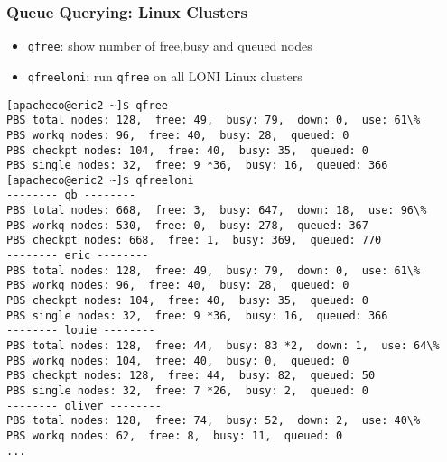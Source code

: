 \documentclass[slidestop,mathserif,compress,xcolor=svgnames,table]{beamer}
\newenvironment{bblock}[0]
{
\begin{beamerboxesrounded}[upper=uppercol1,lower=lowercol1,shadow=true]}
{\end{beamerboxesrounded}}
\newenvironment{eblock}[0]
{
\begin{beamerboxesrounded}[upper=uppercol2,lower=lowercol2,shadow=true]}
{\end{beamerboxesrounded}}
\begin{document}
\begin{frame}[fragile]
\frametitle{\small Queue Querying: Linux Clusters}
\begin{itemize}
\item \texttt{qfree}: show number of free,busy and queued nodes
\item \texttt{qfreeloni}: run \texttt{qfree} on all LONI Linux clusters
\end{itemize}
\begin{eblock}{}
{\tiny
\begin{verbatim}
[apacheco@eric2 ~]$ qfree
PBS total nodes: 128,  free: 49,  busy: 79,  down: 0,  use: 61\%
PBS workq nodes: 96,  free: 40,  busy: 28,  queued: 0
PBS checkpt nodes: 104,  free: 40,  busy: 35,  queued: 0
PBS single nodes: 32,  free: 9 *36,  busy: 16,  queued: 366
[apacheco@eric2 ~]$ qfreeloni
-------- qb --------
PBS total nodes: 668,  free: 3,  busy: 647,  down: 18,  use: 96\%
PBS workq nodes: 530,  free: 0,  busy: 278,  queued: 367
PBS checkpt nodes: 668,  free: 1,  busy: 369,  queued: 770
-------- eric --------
PBS total nodes: 128,  free: 49,  busy: 79,  down: 0,  use: 61\%
PBS workq nodes: 96,  free: 40,  busy: 28,  queued: 0
PBS checkpt nodes: 104,  free: 40,  busy: 35,  queued: 0
PBS single nodes: 32,  free: 9 *36,  busy: 16,  queued: 366
-------- louie --------
PBS total nodes: 128,  free: 44,  busy: 83 *2,  down: 1,  use: 64\%
PBS workq nodes: 104,  free: 40,  busy: 0,  queued: 0
PBS checkpt nodes: 128,  free: 44,  busy: 82,  queued: 50
PBS single nodes: 32,  free: 7 *26,  busy: 2,  queued: 0
-------- oliver --------
PBS total nodes: 128,  free: 74,  busy: 52,  down: 2,  use: 40\%
PBS workq nodes: 62,  free: 8,  busy: 11,  queued: 0
...
\end{verbatim}
}
\end{eblock}
\end{frame}
\end{document}
